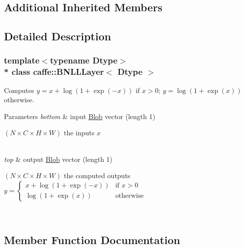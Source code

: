 \subsection*{Additional Inherited Members}


\subsection{Detailed Description}
\subsubsection*{template$<$typename Dtype$>$\\*
class caffe\+::\+B\+N\+L\+L\+Layer$<$ Dtype $>$}

Computes $ y = x + \log(1 + \exp(-x)) $ if $ x > 0 $; $ y = \log(1 + \exp(x)) $ otherwise. 


\begin{DoxyParams}{Parameters}
{\em bottom} & input \hyperlink{classcaffe_1_1Blob}{Blob} vector (length 1)
\begin{DoxyEnumerate}
\item $ (N \times C \times H \times W) $ the inputs $ x $ 
\end{DoxyEnumerate}\\
\hline
{\em top} & output \hyperlink{classcaffe_1_1Blob}{Blob} vector (length 1)
\begin{DoxyEnumerate}
\item $ (N \times C \times H \times W) $ the computed outputs $ y = \left\{ \begin{array}{ll} x + \log(1 + \exp(-x)) & \mbox{if } x > 0 \\ \log(1 + \exp(x)) & \mbox{otherwise} \end{array} \right. $ 
\end{DoxyEnumerate}\\
\hline
\end{DoxyParams}


\subsection{Member Function Documentation}
